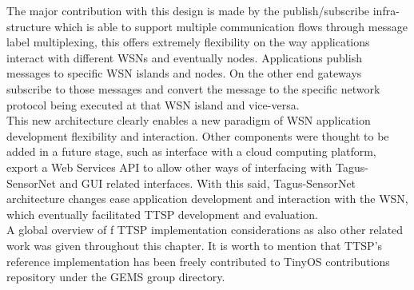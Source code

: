 The major contribution with this design is made by the publish/subscribe infra-structure which is able to support multiple communication flows through message label multiplexing, this offers extremely flexibility on the way applications interact with different WSNs and eventually nodes. Applications publish messages to specific WSN islands and nodes. On the other end gateways subscribe to those messages and convert the message to the specific network protocol being executed at that WSN island and vice-versa.\\
This new architecture clearly enables a new paradigm of WSN application development flexibility and interaction. Other components were thought to be added in a future stage, such as interface with a cloud computing platform, export a Web Services API to allow other ways of interfacing with Tagus-SensorNet and GUI related interfaces. With this said, Tagus-SensorNet architecture changes ease application development and interaction with the WSN, which eventually facilitated TTSP development and evaluation.\\

A global overview of f TTSP implementation considerations as also other related work was given throughout this chapter. It is worth to mention that TTSP’s reference implementation has been freely contributed to TinyOS contributions repository under the GEMS group directory.